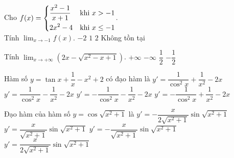 \begin{ex}%
Cho $f(x)=\left\{\begin{aligned}
& \dfrac{x^2-1}{x+1} &\mbox{khi }x>-1 \\ 
& 2x^2-4 &\mbox{khi }x\le-1\end{aligned}\right.$. \\
Tính $\displaystyle \lim_{x\to-1}f(x)$.
\choice
{\True $-2$}
{$1$}
{$2$}
{Không tồn tại}
 \end{ex}
\begin{ex}%
	Tính $\displaystyle \lim_{x\to+\infty}\left(2x-\sqrt{x^2-x+1}\right)$.
\choice
{\True $+\infty $}
{$-\infty $}
{$\dfrac{1}{2}$}
{$-\dfrac{1}{2}$}
 \end{ex}
\begin{ex}%
	Hàm số $y=\tan x+\dfrac{1}{x}-x^2+2$ có đạo hàm là
\choice
{$y'=\dfrac{1}{\cos^2x}+\dfrac{1}{x^2}-2x$}
{\True $y'=\dfrac{1}{\cos^2x}-\dfrac{1}{x^2}-2x$}
{$y'=-\dfrac{1}{\cos^2x}-\dfrac{1}{x^2}-2x$}
{$y'=-\dfrac{1}{\cos^2x}+\dfrac{1}{x^2}-2x$}
 \end{ex}
\begin{ex}%
	Đạo hàm của hàm số $y= \cos\sqrt{x^2+1}$ là
\choice
{$y'=-\dfrac{x}{2\sqrt{x^2+1}} \sin\sqrt{x^2+1}$}
{$y'=\dfrac{x}{\sqrt{x^2+1}} \sin\sqrt{x^2+1}$}
{\True $y'=-\dfrac{x}{\sqrt{x^2+1}} \sin\sqrt{x^2+1}$}
{$y'=\dfrac{x}{2\sqrt{x^2+1}} \sin\sqrt{x^2+1}$}
 \end{ex}
